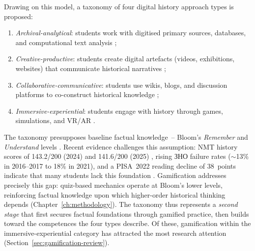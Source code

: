 Drawing on this model, a taxonomy of four digital history approach types is proposed:
\begin{enumerate}
\item \textit{Archival-analytical}: students work with digitised primary sources, databases, and computational text analysis \cite{Davis2017, Lee2014159, Crymble2021};
\item \textit{Creative-productive}: students create digital artefacts (videos, exhibitions, websites) that communicate historical narratives \cite{Bell2016, Coleborne2011, guiliano};
\item \textit{Collaborative-communicative}: students use wikis, blogs, and discussion platforms to co-construct historical knowledge \cite{Soh2013, McLean20144, Graham20151};
\item \textit{Immersive-experiential}: students engage with history through games, simulations, and VR/AR \cite{Connolly2012, Qian2016, Prensky2001}.
\end{enumerate}
The taxonomy presupposes baseline factual knowledge~-- Bloom's \textit{Remember} and \textit{Understand} levels \cite{Anderson2001}. Recent evidence challenges this assumption: NMT history scores of 143.2/200 (2024) and 141.6/200 (2025) \cite{UCEQA2024, UCEQA2025}, rising ЗНО failure rates ($\sim$13\% in 2016--2017 to 18\% in 2021), and a PISA~2022 reading decline of 38~points \cite{OECDPISA2023} indicate that many students lack this foundation \cite{BychkoTereshchenko2023, UNESCO2023}. Gamification addresses precisely this gap: quiz-based mechanics operate at Bloom's lower levels, reinforcing factual knowledge upon which higher-order historical thinking depends (Chapter~\ref{ch:methodology}). The taxonomy thus represents a \textit{second stage} that first secures factual foundations through gamified practice, then builds toward the competences the four types describe. Of these, gamification within the immersive-experiential category has attracted the most research attention (Section~\ref{sec:gamification-review}).

